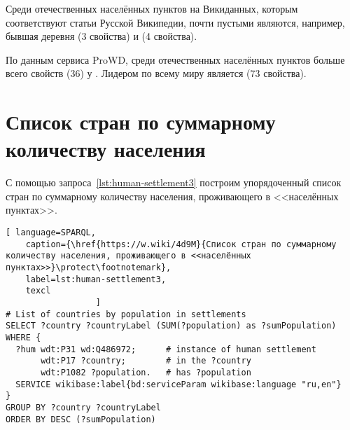 Среди отечественных населённых пунктов на Викиданных, 
которым соответствуют статьи Русской Википедии, 
почти пустыми являются, например, 
бывшая деревня  (3 свойства) 
и  (4 свойства).

По данным сервиса ProWD, 
среди отечественных населённых пунктов 
больше всего свойств (36) у . 
Лидером по всему миру является  (73 свойства)\autocite{humansettlements_ProWD}.



\section{Список стран по суммарному количеству населения}

С помощью запроса~\ref{lst:human-settlement3} 
построим упорядоченный список стран по суммарному количеству населения, проживающего в <<населённых пунктах>>.


\lstset{numbers=left, firstnumber=1, frame=single}
\begin{lstlisting}[ language=SPARQL, 
    caption={\href{https://w.wiki/4d9M}{Список стран по суммарному количеству населения, проживающего в <<населённых пунктах>>}\protect\footnotemark},
    label=lst:human-settlement3,
    texcl 
                  ]
# List of countries by population in settlements
SELECT ?country ?countryLabel (SUM(?population) as ?sumPopulation)
WHERE {
  ?hum wdt:P31 wd:Q486972;      # instance of human settlement
       wdt:P17 ?country;        # in the ?country
       wdt:P1082 ?population.   # has ?population
  SERVICE wikibase:label{bd:serviceParam wikibase:language "ru,en"}
}
GROUP BY ?country ?countryLabel 
ORDER BY DESC (?sumPopulation)
\end{lstlisting}%


